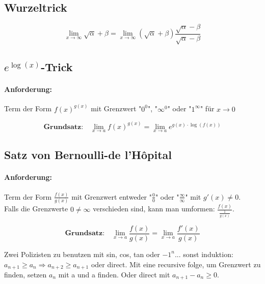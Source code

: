 \documentclass[11pt]{article}
\begin{document}
\subsection{Wurzeltrick}

\begin{equation*}
	\lim_{x\to\infty} \sqrt{\alpha}+\beta = \lim_{x\to\infty}(\sqrt{\alpha}+\beta)\frac{\sqrt{\alpha}-\beta}{\sqrt{\alpha}-\beta}
\end{equation*}

\subsection{$e^{\log(x)}$-Trick}

\paragraph{Anforderung:}Term der Form $f(x)^{g(x)}$ mit Grenzwert "$0^0$", "$\infty^0$" oder "$1^\infty$" f{\"u}r $x \to 0$

\begin{equation*}
	\textbf{Grundsatz:}\quad\lim_{x\to a}f(x)^{g(x)} = \lim_{x\to a}e^{g(x) \cdot \log(f(x))}
\end{equation*}

\subsection{Satz von Bernoulli-de l'H{\^o}pital}

\paragraph{Anforderung:}Term der Form $\frac{f(x)}{g(x)}$ mit Grenzwert entweder "$\frac{0}{0}$" oder "$\frac{\infty}{\infty}$" mit $g'(x) \neq 0$. \\
Falls die Grenzwerte $0 \neq \infty$ verschieden sind, kann man umformen: $\frac{f(x)}{\frac{1}{g(x)}}$.

\begin{equation*}
	\textbf{Grundsatz:}\quad\lim_{x\to a}\frac{f(x)}{g(x)} = \lim_{x\to a}\frac{f'(x)}{g(x)}
\end{equation*}

Zwei Polizisten zu benutzen mit sin, cos, tan oder $-1^n$... sonst induktion:$a_{n+1}\geq a_{n} \Rightarrow a_{n+2} \geq a_{n+1}$ oder direct. Mit eine recursive folge, um Grenzwert zu finden, setzen $a_n$ mit a und a finden. Oder direct mit $a_{n+1} - a_n \geq 0$.
\end{document}
